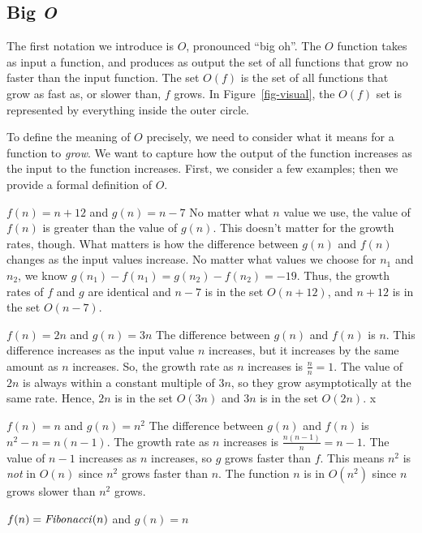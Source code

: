\begin{schemeregion}
\subsection{Big \emph{O}}\label{sec:bigO} The first notation we introduce is $O$, pronounced ``big oh''.  The $O$ function takes as input a function, and produces as output the set of all functions that grow no faster than the input function.  The set $O(f)$ is the set of all functions that grow as fast as, or slower than, $f$ grows.  In Figure~\ref{fig-visual}, the $O(f)$ set is represented by everything inside the outer circle.

To define the meaning of $O$ precisely, we need to consider what it means for a function to \emph{grow}.  We want to capture how the output of the function increases as the input to the function increases.  First, we consider a few examples; then we provide a formal definition of $O$.
\begin{descriptionlist}
\item[$f(n) = n + 12$ and $g(n) = n - 7$]\forcenl  
No matter what $n$ value we use, the value of $f(n)$ is greater than the value of $g(n)$.  This doesn't matter for the growth rates, though.  What matters is how the difference between $g(n)$ and $f(n)$ changes as the input values increase.  No matter what values we choose for $n_1$ and $n_2$, we know  $g(n_1) - f(n_1) = g(n_2) - f(n_2) = -19$.  Thus, the growth rates of $f$ and $g$ are identical and  $n - 7$ is in the set $O(n + 12)$, and $n + 12$ is in the set $O(n - 7)$.  
\item[$f(n) = 2n$ and $g(n) = 3n$]\forcenl 
The difference between $g(n)$ and $f(n)$ is $n$.  This difference increases as the input value $n$ increases, but it increases by the same amount as $n$ increases.  So, the growth rate as $n$ increases is $\frac{n}{n} = 1$.  The value of $2n$ is always within a constant multiple of $3n$, so they grow asymptotically at the same rate.  Hence, $2n$ is in the set $O(3n)$ and $3n$ is in the set $O(2n)$.
x\item[$f(n) = n$ and $g(n) = n^2$]\forcenl
The difference between $g(n)$ and $f(n)$ is $n^2 - n = n (n - 1)$.  The growth rate as $n$ increases is $\frac{n (n - 1)}{n} = n - 1$.  The value of $n - 1$ increases as $n$ increases, so $g$ grows faster than $f$.  This means $n^2$ is \emph{not} in $O(n)$ since $n^2$ grows faster than $n$.  The function $n$ is in $O(n^2)$ since $n$ grows slower than $n^2$ grows.
\item[$f(n) = \textrm{\emph{Fibonacci}}(n)$ and $g(n) = n$] \forcenl{}

\end{descriptionlist}
\end{schemeregion}
